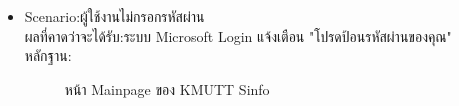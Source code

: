 \documentclass[14pt,oneside,openright,a4paper]{cpe-thai-project}
\begin{document}
\begin{itemize}
  \item Scenario:ผู้ใช้งานไม่กรอกรหัสผ่าน\\ผลที่คาดว่าจะได้รับ:ระบบ Microsoft Login แจ้งเตือน "โปรดป้อนรหัสผ่านของคุณ"\\หลักฐาน:\\
  \begin{figure}[!h]\centering
    \setlength{\fboxrule}{0.5mm} %
    \setlength{\fboxsep}{0.5cm}
    \caption{หน้า Mainpage ของ KMUTT Sinfo}\label{fig:sinfo}
  \end{figure}
\end{itemize}
\newpage
\end{document}
